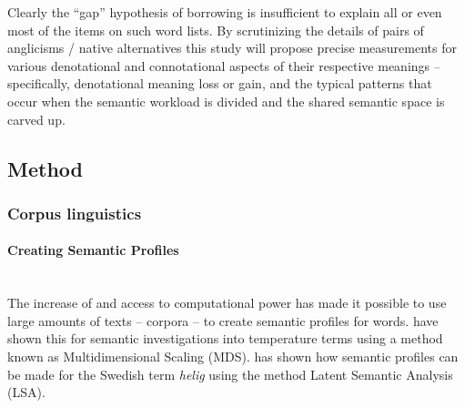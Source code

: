 \documentclass[a4paper]{article}
\begin{document}
Clearly the ``gap'' hypothesis of borrowing is insufficient to explain all or even most of the items on such word lists. 
By scrutinizing the details of pairs of anglicisms / native alternatives this study will propose precise measurements for various denotational and connotational aspects of their respective meanings -- specifically, denotational meaning loss or gain, and the typical patterns that occur when the semantic workload is divided and the shared semantic space is carved up.


\subsection{Method}


\subsubsection{Corpus linguistics}
%
\paragraph{Creating Semantic Profiles} \hspace{0pt} \\
The increase of and access to computational power has made it possible to use large amounts of texts -- corpora -- to create semantic profiles for words. 
\citet{Koptjevskaja-Tamm2013} have shown this for semantic investigations into temperature terms using a method known as Multidimensional Scaling (MDS). 
\citet{Sikstrom2012} has shown how semantic profiles can be made for the Swedish term \textit{helig} using the method Latent Semantic Analysis (LSA). 
\end{document}
